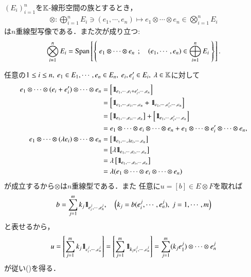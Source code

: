 	\begin{screen}
		\begin{thm}[標準写像の多重線型性]\label{thm:tensor_product_is_bilinear}
			$(E_i)_{i=1}^n$を$\mathbb{K}$-線形空間の族とするとき，
			\begin{align}
				\otimes : \bigoplus_{i=1}^n E_i \ni (e_1,\cdots,e_n) \longmapsto e_1 \otimes \cdots \otimes e_n \in \bigotimes_{i=1}^n E_i
			\end{align}
			は$n$重線型写像である．また次が成り立つ:
			\begin{align}
				\bigotimes_{i=1}^n E_i = \mathrm{Span}\left[ \left\{\ e_1 \otimes \cdots \otimes e_n\ \, ; \quad (e_1,\cdots,e_n) \in \bigoplus_{i=1}^n E_i\ \right\} \right].
				\label{eq:thm_tensor_product_is_bilinear}
			\end{align}
		\end{thm}
	\end{screen}
	
	\begin{prf}
		任意の$1 \leq i \leq n,\ e_1 \in E_1,\cdots,e_n \in E_n,
		\ e_i,e_i' \in E_i,\ \lambda \in \mathbb{K}$に対して
		\begin{align}
			e_1 \otimes \cdots \otimes (e_i + e_i') \otimes \cdots \otimes e_n 
			&= \left[ \mbox{1}\hspace{-0.25em}\mbox{l}_{e_1,\cdots,e_i + e_i',\cdots,e_n} \right] \\
			&= \left[ \mbox{1}\hspace{-0.25em}\mbox{l}_{e_1,\cdots,e_i,\cdots,e_n} 
				+ \mbox{1}\hspace{-0.25em}\mbox{l}_{e_1,\cdots,e_i',\cdots,e_n} \right] \\
			&= \left[ \mbox{1}\hspace{-0.25em}\mbox{l}_{e_1,\cdots,e_i,\cdots,e_n} \right]
				+ \left[ \mbox{1}\hspace{-0.25em}\mbox{l}_{e_1,\cdots,e_i',\cdots,e_n} \right] \\
			&=e_1 \otimes \cdots \otimes e_i \otimes \cdots \otimes e_n 
			+ e_1 \otimes \cdots \otimes e_i' \otimes \cdots \otimes e_n, \\
			e_1 \otimes \cdots \otimes (\lambda e_i) \otimes \cdots \otimes e_n 
			&= \left[ \mbox{1}\hspace{-0.25em}\mbox{l}_{e_1,\cdots,\lambda e_i,\cdots,e_n} \right] \\
			&= \left[ \lambda \mbox{1}\hspace{-0.25em}\mbox{l}_{e_1,\cdots,e_i,\cdots,e_n} \right] \\
			&= \lambda \left[ \mbox{1}\hspace{-0.25em}\mbox{l}_{e_1,\cdots,e_i,\cdots,e_n} \right] \\
			&= \lambda (e_1 \otimes \cdots \otimes e_i \otimes \cdots \otimes e_n) 
		\end{align}
		が成立するから$\otimes$は$n$重線型である．また
		任意に$u = [b] \in E \otimes F$を取れば
		\begin{align}
			b = \sum_{j=1}^m k_j \mbox{1}\hspace{-0.25em}\mbox{l}_{e^j_i,\cdots,e^j_n},
			\quad \left( k_j = b(e^j_i,\cdots,e^j_n),\ j=1,\cdots,m \right)
		\end{align}
		と表せるから，
		\begin{align}
			u = \left[ \sum_{j=1}^m k_j \mbox{1}\hspace{-0.25em}\mbox{l}_{e^j_i,\cdots,e^j_n} \right]
			= \left[ \sum_{j=1}^m \mbox{1}\hspace{-0.25em}\mbox{l}_{k_j e^j_i,\cdots,e^j_n} \right]
			= \sum_{j=1}^m (k_j e^j_1) \otimes \cdots \otimes e^j_n
		\end{align}
		が従い()を得る．
		\QED
	\end{prf}
	
